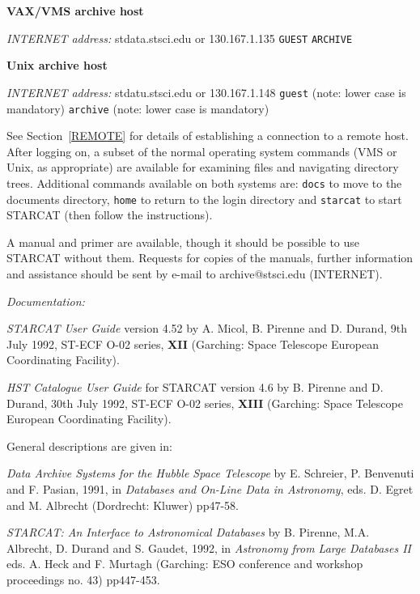 \documentclass[twoside,11pt]{article}
\begin{document}
{\bf VAX/VMS archive host}

{\it INTERNET address:} stdata.stsci.edu or 130.167.1.135
 \verb-GUEST-
 \verb-ARCHIVE-

{\bf Unix archive host}

{\it INTERNET address:} stdatu.stsci.edu or 130.167.1.148
 \verb-guest- (note: lower case is mandatory)
 \verb-archive- (note: lower case is mandatory)

See Section~\ref{REMOTE} for details of establishing a connection to
a remote host. After logging on, a subset of the normal operating system
commands (VMS or Unix, as appropriate) are available for examining files
and navigating directory trees. Additional commands available on both
systems are: \verb-docs- to move to the documents directory, \verb-home-
to return to the login directory and \verb-starcat- to start STARCAT
(then follow the instructions).

A manual and primer are available, though it should be possible to use
STARCAT without them. Requests for copies of the manuals, further
information and assistance should be sent by e-mail to archive@stsci.edu
(INTERNET).

{\it Documentation:}

{\it STARCAT User Guide} version 4.52 by A. Micol, B. Pirenne and
D. Durand, 9th July 1992, ST-ECF O-02 series, {\bf XII} (Garching:
Space Telescope European Coordinating Facility).

{\it HST Catalogue User Guide} for STARCAT version 4.6 by B. Pirenne and
D. Durand, 30th July 1992, ST-ECF O-02 series, {\bf XIII} (Garching:
Space Telescope European Coordinating Facility).

General descriptions are given in:

{\it Data Archive Systems for the Hubble Space Telescope} by E.
Schreier, P. Benvenuti and F. Pasian, 1991, in {\it Databases and
On-Line Data in Astronomy}, eds. D. Egret and M. Albrecht (Dordrecht:
Kluwer) pp47-58.

{\it STARCAT: An Interface to Astronomical Databases} by B. Pirenne,
M.A. Albrecht, D. Durand and S. Gaudet, 1992, in {\it Astronomy from
Large Databases II} eds. A. Heck and F. Murtagh (Garching: ESO
conference and workshop proceedings no. 43) pp447-453.
\end{document}
